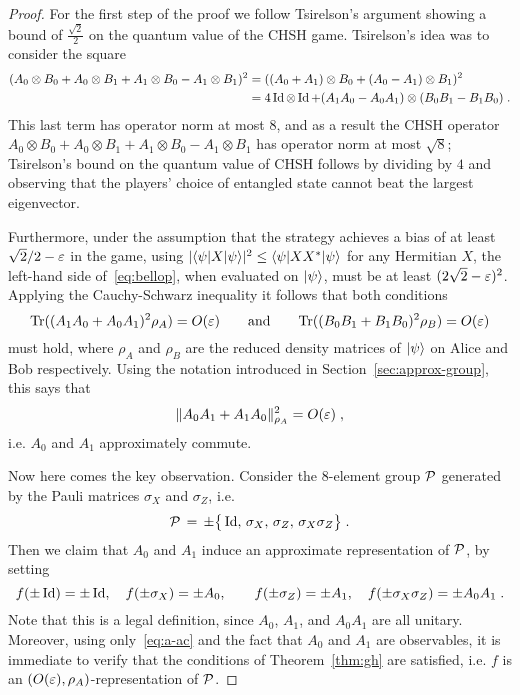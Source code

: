 \begin{proof}
For the first step of the proof we follow Tsirelson's argument showing a bound of $\frac{\sqrt{2}}{2}$ on the quantum value of the CHSH game. Tsirelson's idea was to consider the square
\begin{align}
(A_0\otimes B_0 + A_0\otimes B_1 + A_1\otimes B_0 - A_1\otimes B_1 )^2 &=( (A_0+A_1)\otimes B_0 + (A_0-A_1)\otimes B_1 )^2\label{eq:bellop}\\
&= 4\mathop{\rm Id}\nolimits\otimes \mathop{\rm Id}\nolimits + (A_1A_0-A_0A_1)\otimes (B_0B_1-B_1B_0)\;.\notag
\end{align}
This last term has operator norm at most $8$, and as a result the CHSH operator $A_0\otimes B_0 + A_0\otimes B_1 + A_1\otimes B_0 - A_1\otimes B_1$ has operator norm at most $\sqrt{8}$; Tsirelson's bound on the quantum value of CHSH follows by dividing by $4$ and observing that the players' choice of entangled state cannot beat the largest eigenvector.

Furthermore, under the assumption that the strategy achieves a bias of at least $\sqrt{2}/2-\varepsilon$ in the game, using $|\langle\psi|X|\psi\rangle|^2 \leq \langle\psi|XX^*|\psi\rangle$ for any Hermitian $X$, the left-hand side of~\eqref{eq:bellop}, when evaluated on $|\psi\rangle$, must be at least $(2\sqrt{2}-\varepsilon)^2$. Applying the Cauchy-Schwarz inequality it follows that both conditions
$$\mbox{\rm Tr}((A_1A_0 + A_0A_1)^2\rho_A) = O({\varepsilon})\qquad \text{and}\qquad \mbox{\rm Tr}((B_0B_1+B_1B_0)^2 \rho_B) = O({\varepsilon})$$
must hold, where $\rho_A$ and $\rho_B$ are the reduced density matrices of $|\psi\rangle$ on Alice and Bob respectively. 
Using the notation introduced in Section~\ref{sec:approx-group}, this says that 
\begin{equation}\label{eq:a-ac}
\|A_0A_1 + A_1A_0\|_{\rho_A}^2 = O({\varepsilon})\;,
\end{equation}
 i.e. $A_0$ and $A_1$ approximately commute. 

Now here comes the key observation. Consider the $8$-element group $\mathcal{P}$ generated by the Pauli matrices $\sigma_X$ and $\sigma_Z$, i.e. 
$$\mathcal{P}\,=\,\pm\big\{ \mathop{\rm Id}\nolimits,\, \sigma_X,\,\sigma_Z,\, \sigma_X\sigma_Z\big\}\;.$$
Then we claim that $A_0$ and $A_1$ induce an approximate representation of $\mathcal{P}$, by setting 
$$ f(\pm \mathop{\rm Id}\nolimits)=\pm\mathop{\rm Id}\nolimits,\quad f(\pm\sigma_X)=\pm A_0,\quad\quad f(\pm\sigma_Z)=\pm A_1,\quad f(\pm\sigma_X\sigma_Z) = \pm A_0A_1\;.$$
Note that this is a legal definition, since $A_0$, $A_1$, and $A_0A_1$ are all unitary. Moreover, using only~\eqref{eq:a-ac} and the fact that $A_0$ and $A_1$ are observables, it is immediate to verify that the conditions of Theorem~\ref{thm:gh} are satisfied, i.e. $f$ is an $(O({\varepsilon}),\rho_A)$-representation of $\mathcal{P}$. 


\end{proof}
